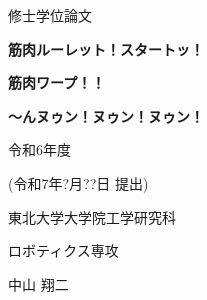 \documentclass[a4paper,12pt,twoside,dvipdfmx]{jreport} %
\begin{document}

\cleardoublepage


\begin{titlepage}
    \begin{center}
  
        {\fontsize{24pt}{24pt}\selectfont  修士学位論文}
  
        \vspace{3cm}
  
        {\fontsize{20pt}{20pt}\selectfont \textbf{筋肉ルーレット！スタートッ！}}

        \vspace{0.5cm}
        {\fontsize{20pt}{20pt}\selectfont \textbf{筋肉ワープ！！}}

        \vspace{0.5cm}
        {\fontsize{20pt}{20pt}\selectfont \textbf{～んヌゥン！ヌゥン！ヌゥン！}}

        \vspace{8cm}
        {\fontsize{18pt}{18pt}\selectfont 令和6年度} 

        \vspace{0.5cm}
        {\fontsize{18pt}{18pt}\selectfont (令和7年?月??日 提出)} 
  
        \vspace{3cm}
        {\fontsize{18pt}{18pt}\selectfont 東北大学大学院工学研究科}

        \vspace{0.5cm}
        {\fontsize{18pt}{18pt}\selectfont ロボティクス専攻}
  
  
        \vspace{1.0cm}
        {\fontsize{18pt}{18pt}\selectfont 中山 翔二}
  
  
    \end{center}
  \end{titlepage}
\cleardoublepage


\cleardoublepage


\setcounter{page}{1}
\tableofcontents %
\listoffigures %
\listoftables %





% 
% 







\end{document}
